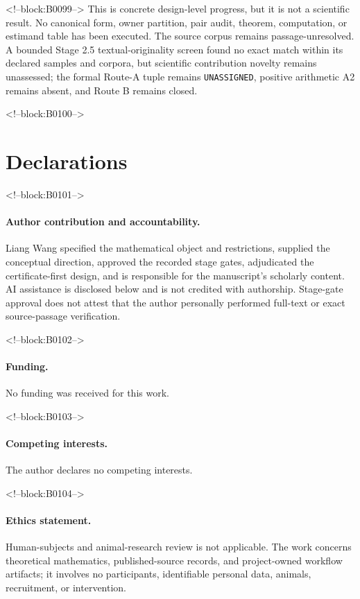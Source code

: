 \documentclass[11pt]{article}
\begin{document}
<!--block:B0099-->
This is concrete design-level progress, but it is not a scientific
result. No canonical form, owner partition, pair audit, theorem,
computation, or estimand table has been executed. The source corpus
remains passage-unresolved. A bounded Stage 2.5 textual-originality
screen found no exact match within its declared samples and corpora, but
scientific contribution novelty remains unassessed; the formal Route-A
tuple remains \texttt{UNASSIGNED}, positive arithmetic A2 remains absent,
and Route B remains closed.

<!--block:B0100-->
\section*{Declarations}

<!--block:B0101-->
\paragraph{Author contribution and accountability.}
Liang Wang specified the mathematical object and restrictions, supplied
the conceptual direction, approved the recorded stage gates,
adjudicated the certificate-first design, and is responsible for the
manuscript's scholarly content. AI assistance is disclosed below and is
not credited with authorship. Stage-gate approval does not attest that
the author personally performed full-text or exact source-passage
verification.

<!--block:B0102-->
\paragraph{Funding.} No funding was received for this work.

<!--block:B0103-->
\paragraph{Competing interests.} The author declares no competing
interests.

<!--block:B0104-->
\paragraph{Ethics statement.} Human-subjects and animal-research review
is not applicable. The work concerns theoretical mathematics,
published-source records, and project-owned workflow artifacts; it
involves no participants, identifiable personal data, animals,
recruitment, or intervention.
\end{document}
